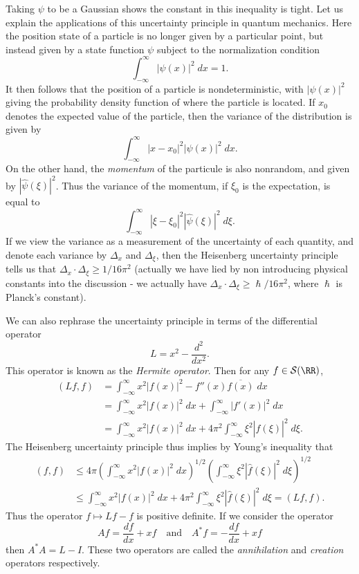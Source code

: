 Taking $\psi$ to be a Gaussian shows the constant in this inequality is tight. Let us explain the applications of this uncertainty principle in quantum mechanics. Here the position state of a particle is no longer given by a particular point, but instead given by a state function $\psi$ subject to the normalization condition
%
\[ \int_{-\infty}^\infty |\psi(x)|^2\; dx = 1. \]
%
It then follows that the position of a particle is nondeterministic, with $|\psi(x)|^2$ giving the probability density function of where the particle is located. If $x_0$ denotes the expected value of the particle, then the variance of the distribution is given by
%
\[ \int_{-\infty}^\infty |x - x_0|^2 |\psi(x)|^2\; dx. \]
%
On the other hand, the \emph{momentum} of the particule is also nonrandom, and given by $|\widehat{\psi}(\xi)|^2$. Thus the variance of the momentum, if $\xi_0$ is the expectation, is equal to
%
\[ \int_{-\infty}^\infty |\xi - \xi_0|^2 |\widehat{\psi}(\xi)|^2\; d\xi. \]
%
If we view the variance as a measurement of the uncertainty of each quantity, and denote each variance by $\Delta_x$ and $\Delta_\xi$, then the Heisenberg uncertainty principle tells us that $\Delta_x \cdot \Delta_\xi \geq 1/16 \pi^2$ (actually we have lied by non introducing physical constants into the discussion - we actually have $\Delta_x \cdot \Delta_\xi \geq \hslash / 16 \pi^2$, where $\hslash$ is Planck's constant).

We can also rephrase the uncertainty principle in terms of the differential operator
%
\[ L = x^2 - \frac{d^2}{dx^2}. \]
%
This operator is known as the \emph{Hermite operator}. Then for any $f \in \mathcal{S}(\RR)$,
%
\begin{align*}
    (Lf,f) &= \int_{-\infty}^\infty x^2 |f(x)|^2 - f''(x) \overline{f(x)}\; dx\\
    &= \int_{-\infty}^\infty x^2 |f(x)|^2\; dx + \int_{-\infty}^\infty |f'(x)|^2\; dx\\
    &= \int_{-\infty}^\infty x^2 |f(x)|^2\; dx + 4 \pi^2 \int_{-\infty}^\infty \xi^2 |\widehat{f}(\xi)|^2\; d\xi.
\end{align*}
%
The Heisenberg uncertainty principle thus implies by Young's inequality that
%
\begin{align*}
    (f,f) &\leq 4 \pi \left( \int_{-\infty}^\infty x^2 |f(x)|^2\; dx \right)^{1/2} \left( \int_{-\infty}^\infty \xi^2 |\widehat{f}(\xi)|^2\; d\xi \right)^{1/2}\\
    &\leq \int_{-\infty}^\infty x^2 |f(x)|^2\; dx + 4 \pi^2 \int_{-\infty}^\infty \xi^2 |\widehat{f}(\xi)|^2\; d\xi = (Lf,f).
\end{align*}
%
Thus the operator $f \mapsto Lf - f$ is positive definite. If we consider the operator
%
\[ Af = \frac{df}{dx} + xf \quad\text{and}\quad A^* f = - \frac{df}{dx} + xf \]
%
then $A^*A = L - I$. These two operators are called the \emph{annihilation} and \emph{creation} operators respectively.

